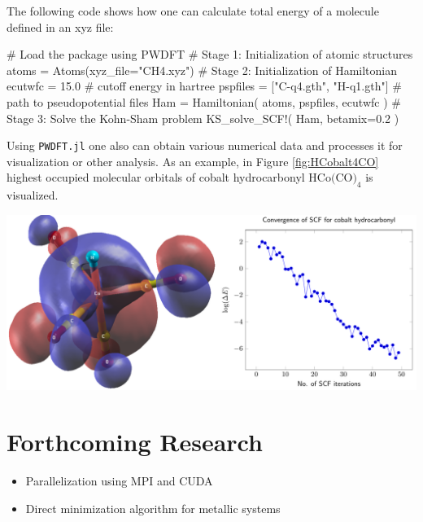 \documentclass[a0,landscape]{a0poster}
\begin{document}
\begin{multicols}{3}
The following code shows how one can calculate total energy of a molecule
defined in an xyz file:

\begin{juliacode}
# Load the package
using PWDFT
# Stage 1: Initialization of atomic structures
atoms = Atoms(xyz_file="CH4.xyz")
# Stage 2: Initialization of Hamiltonian
ecutwfc = 15.0  # cutoff energy in hartree
pspfiles = ["C-q4.gth", "H-q1.gth"] # path to pseudopotential files
Ham = Hamiltonian( atoms, pspfiles, ecutwfc )
# Stage 3: Solve the Kohn-Sham problem
KS_solve_SCF!( Ham, betamix=0.2 )
\end{juliacode}

Using \texttt{PWDFT.jl} one also can obtain various numerical data
and processes it for visualization or other analysis. As an example,
in Figure \ref{fig:HCobalt4CO} highest occupied molecular orbitals
of cobalt hydrocarbonyl $\textrm{HCo(CO)}_{4}$ is visualized.

\begin{center}
\includegraphics[scale=1.0]{figure02.pdf}
\label{fig:HCobalt4CO}
\end{center}



\section*{Forthcoming Research}

\begin{itemize}
\item Parallelization using MPI and CUDA
\item Direct minimization algorithm for metallic systems
\end{itemize}



\end{multicols}
\end{document}
